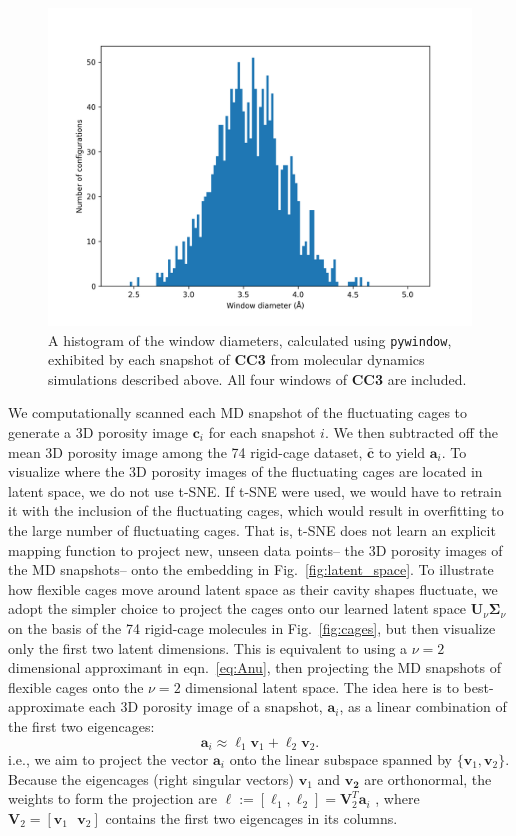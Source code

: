\documentclass[journal=jacsat,manuscript=article]{achemso}
\begin{document}
\begin{figure}
\centering
	\includegraphics[width=0.65\columnwidth]{../cc3_histogram.png}
	\caption{A histogram of the window diameters, calculated using \texttt{pywindow}, exhibited by each snapshot of \textbf{CC3} from molecular dynamics simulations described above. All four windows of \textbf{CC3} are included.
	} \label{fig:window_diameter_hist}
\end{figure}

We computationally scanned each MD snapshot of the fluctuating cages to generate a 3D porosity image $\mathbf{c}_i$ for each snapshot $i$. We then subtracted off the mean 3D porosity image among the 74 rigid-cage dataset, $\bar{\mathbf{c}}$ to yield $\mathbf{a}_i$.
To visualize where the 3D porosity images of the fluctuating cages are located in latent space, we do not use t-SNE. If t-SNE were used, we would have to retrain it with the inclusion of the fluctuating cages, which would result in overfitting to the large number of fluctuating cages. That is, t-SNE does not learn an explicit mapping function to project new, unseen data points-- the 3D porosity images of the MD snapshots-- onto the embedding in Fig.~\ref{fig:latent_space}. To illustrate how flexible cages move around latent space as their cavity shapes fluctuate, we adopt the simpler choice to project the cages onto our learned latent space $\mathbf{U}_\nu \mathbf{\Sigma}_\nu$ on the basis of the 74 rigid-cage molecules in Fig.~\ref{fig:cages}, but then visualize only the first two latent dimensions. This is equivalent to using a $\nu=2$ dimensional approximant in eqn.~\ref{eq:Anu}, then projecting the MD snapshots of flexible cages onto the $\nu=2$ dimensional latent space. 
The idea here is to best-approximate each 3D porosity image of a snapshot, $\mathbf{a}_i$, as a linear combination of the first two eigencages:
\begin{equation}
\mathbf{a}_i \approx \ell_1 \mathbf{v}_1 + \ell_2 \mathbf{v}_2.
\end{equation} i.e., we aim to project the vector $\mathbf{a}_i$ onto the linear subspace spanned by $\{\mathbf{v}_1, \mathbf{v}_2\}$. Because the eigencages (right singular vectors) $\mathbf{v}_1$ and $\mathbf{v_2}$ are orthonormal, the weights to form the projection are $\boldsymbol \ell := [\ell_1 , \ell_2] = \mathbf{V}_2^T \mathbf{a}_i$ \cite{strang1993introduction}, where $\mathbf{V}_2 = [\mathbf{v}_1 \text{ } \mathbf{v}_2]$ contains the first two eigencages in its columns.
\end{document}
